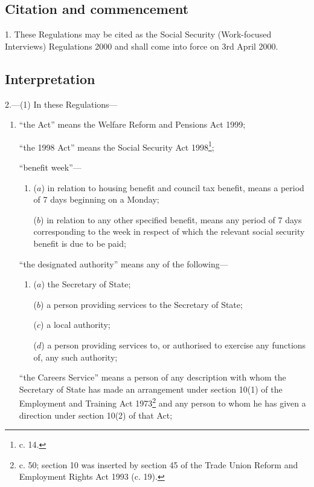 \documentclass[12pt,a4paper]{article}
\begin{document}
\renewcommand\parthead{— Part I}

\subsection[1. Citation and commencement]{Citation and commencement}

1.  These Regulations may be cited as the Social Security (Work-focused Interviews) Regulations 2000 and shall come into force on 3rd April 2000.

\subsection[2. Interpretation]{Interpretation}

2.—(1)  In these Regulations—
\begin{enumerate}\item[]
“the Act” means the Welfare Reform and Pensions Act 1999;

“the 1998 Act” means the Social Security Act 1998\footnote{ c. 14.};

“benefit week”—
\begin{enumerate}\item[]
($a$) 
in relation to housing benefit and council tax benefit, means a period of 7 days beginning on a Monday;

($b$) 
in relation to any other specified benefit, means any period of 7 days corresponding to the week in respect of which the relevant social security benefit is due to be paid;
\end{enumerate}

“the designated authority” means any of the following—
\begin{enumerate}\item[]
($a$) 
the Secretary of State;

($b$) 
a person providing services to the Secretary of State;

($c$) 
a local authority;

($d$) 
a person providing services to, or authorised to exercise any functions of, any such authority;
\end{enumerate}

“the Careers Service” means a person of any description with whom the Secretary of State has made an arrangement under section 10(1) of the Employment and Training Act 1973\footnote{ c. 50; section 10 was inserted by section 45 of the Trade Union Reform and Employment Rights Act 1993 (c. 19).} and any person to whom he has given a direction under section 10(2) of that Act;


\end{enumerate}
\end{document}

